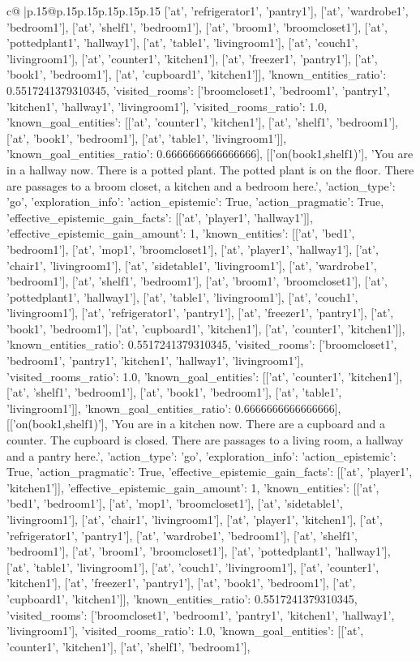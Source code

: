 \documentclass{article}
\begin{document}
{\begin{supertabular}{c@{$\;$}|p{.15\linewidth}@{}p{.15\linewidth}p{.15\linewidth}p{.15\linewidth}p{.15\linewidth}p{.15\linewidth}}
{{{['at', 'refrigerator1', 'pantry1'], ['at', 'wardrobe1', 'bedroom1'], ['at', 'shelf1', 'bedroom1'], ['at', 'broom1', 'broomcloset1'], ['at', 'pottedplant1', 'hallway1'], ['at', 'table1', 'livingroom1'], ['at', 'couch1', 'livingroom1'], ['at', 'counter1', 'kitchen1'], ['at', 'freezer1', 'pantry1'], ['at', 'book1', 'bedroom1'], ['at', 'cupboard1', 'kitchen1']], 'known_entities_ratio': 0.5517241379310345, 'visited_rooms': ['broomcloset1', 'bedroom1', 'pantry1', 'kitchen1', 'hallway1', 'livingroom1'], 'visited_rooms_ratio': 1.0, 'known_goal_entities': [['at', 'counter1', 'kitchen1'], ['at', 'shelf1', 'bedroom1'], ['at', 'book1', 'bedroom1'], ['at', 'table1', 'livingroom1']], 'known_goal_entities_ratio': 0.6666666666666666}}], [['on(book1,shelf1)'], 'You are in a hallway now. There is a potted plant. The potted plant is on the floor. There are passages to a broom closet, a kitchen and a bedroom here.', {'action_type': 'go', 'exploration_info': {'action_epistemic': True, 'action_pragmatic': True, 'effective_epistemic_gain_facts': [['at', 'player1', 'hallway1']], 'effective_epistemic_gain_amount': 1, 'known_entities': [['at', 'bed1', 'bedroom1'], ['at', 'mop1', 'broomcloset1'], ['at', 'player1', 'hallway1'], ['at', 'chair1', 'livingroom1'], ['at', 'sidetable1', 'livingroom1'], ['at', 'wardrobe1', 'bedroom1'], ['at', 'shelf1', 'bedroom1'], ['at', 'broom1', 'broomcloset1'], ['at', 'pottedplant1', 'hallway1'], ['at', 'table1', 'livingroom1'], ['at', 'couch1', 'livingroom1'], ['at', 'refrigerator1', 'pantry1'], ['at', 'freezer1', 'pantry1'], ['at', 'book1', 'bedroom1'], ['at', 'cupboard1', 'kitchen1'], ['at', 'counter1', 'kitchen1']], 'known_entities_ratio': 0.5517241379310345, 'visited_rooms': ['broomcloset1', 'bedroom1', 'pantry1', 'kitchen1', 'hallway1', 'livingroom1'], 'visited_rooms_ratio': 1.0, 'known_goal_entities': [['at', 'counter1', 'kitchen1'], ['at', 'shelf1', 'bedroom1'], ['at', 'book1', 'bedroom1'], ['at', 'table1', 'livingroom1']], 'known_goal_entities_ratio': 0.6666666666666666}}], [['on(book1,shelf1)'], 'You are in a kitchen now. There are a cupboard and a counter. The cupboard is closed. There are passages to a living room, a hallway and a pantry here.', {'action_type': 'go', 'exploration_info': {'action_epistemic': True, 'action_pragmatic': True, 'effective_epistemic_gain_facts': [['at', 'player1', 'kitchen1']], 'effective_epistemic_gain_amount': 1, 'known_entities': [['at', 'bed1', 'bedroom1'], ['at', 'mop1', 'broomcloset1'], ['at', 'sidetable1', 'livingroom1'], ['at', 'chair1', 'livingroom1'], ['at', 'player1', 'kitchen1'], ['at', 'refrigerator1', 'pantry1'], ['at', 'wardrobe1', 'bedroom1'], ['at', 'shelf1', 'bedroom1'], ['at', 'broom1', 'broomcloset1'], ['at', 'pottedplant1', 'hallway1'], ['at', 'table1', 'livingroom1'], ['at', 'couch1', 'livingroom1'], ['at', 'counter1', 'kitchen1'], ['at', 'freezer1', 'pantry1'], ['at', 'book1', 'bedroom1'], ['at', 'cupboard1', 'kitchen1']], 'known_entities_ratio': 0.5517241379310345, 'visited_rooms': ['broomcloset1', 'bedroom1', 'pantry1', 'kitchen1', 'hallway1', 'livingroom1'], 'visited_rooms_ratio': 1.0, 'known_goal_entities': [['at', 'counter1', 'kitchen1'], ['at', 'shelf1', 'bedroom1'], }}}
\end{supertabular}}
\end{document}
